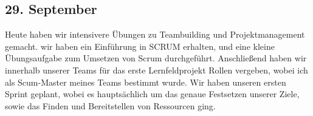 \subsection{29. September}
Heute haben wir intensivere Übungen zu Teambuilding und Projektmanagement gemacht. wir haben ein Einführung in SCRUM erhalten, und eine kleine Übungsaufgabe zum Umsetzen von Scrum durchgeführt. Anschließend haben wir innerhalb unserer Teams für das erste Lernfeldprojekt Rollen vergeben, wobei ich als Scum-Master meines Teams bestimmt wurde. Wir haben unseren ersten Sprint geplant, wobei es hauptsächlich um das genaue Festsetzen unserer Ziele, sowie das Finden und Bereitstellen von Ressourcen ging.